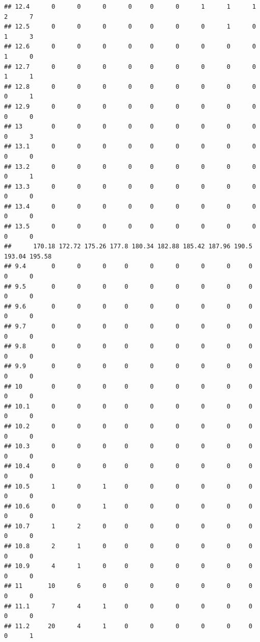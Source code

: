 \documentclass[
]{article}
\begin{document}
\begin{verbatim}
## 12.4      0      0      0      0     0      0      1      1      1     2      7
## 12.5      0      0      0      0     0      0      0      1      0     1      3
## 12.6      0      0      0      0     0      0      0      0      0     1      0
## 12.7      0      0      0      0     0      0      0      0      0     1      1
## 12.8      0      0      0      0     0      0      0      0      0     0      1
## 12.9      0      0      0      0     0      0      0      0      0     0      0
## 13        0      0      0      0     0      0      0      0      0     0      3
## 13.1      0      0      0      0     0      0      0      0      0     0      0
## 13.2      0      0      0      0     0      0      0      0      0     0      1
## 13.3      0      0      0      0     0      0      0      0      0     0      0
## 13.4      0      0      0      0     0      0      0      0      0     0      0
## 13.5      0      0      0      0     0      0      0      0      0     0      0
##      170.18 172.72 175.26 177.8 180.34 182.88 185.42 187.96 190.5 193.04 195.58
## 9.4       0      0      0     0      0      0      0      0     0      0      0
## 9.5       0      0      0     0      0      0      0      0     0      0      0
## 9.6       0      0      0     0      0      0      0      0     0      0      0
## 9.7       0      0      0     0      0      0      0      0     0      0      0
## 9.8       0      0      0     0      0      0      0      0     0      0      0
## 9.9       0      0      0     0      0      0      0      0     0      0      0
## 10        0      0      0     0      0      0      0      0     0      0      0
## 10.1      0      0      0     0      0      0      0      0     0      0      0
## 10.2      0      0      0     0      0      0      0      0     0      0      0
## 10.3      0      0      0     0      0      0      0      0     0      0      0
## 10.4      0      0      0     0      0      0      0      0     0      0      0
## 10.5      1      0      1     0      0      0      0      0     0      0      0
## 10.6      0      0      1     0      0      0      0      0     0      0      0
## 10.7      1      2      0     0      0      0      0      0     0      0      0
## 10.8      2      1      0     0      0      0      0      0     0      0      0
## 10.9      4      1      0     0      0      0      0      0     0      0      0
## 11       10      6      0     0      0      0      0      0     0      0      0
## 11.1      7      4      1     0      0      0      0      0     0      0      0
## 11.2     20      4      1     0      0      0      0      0     0      0      1

\end{verbatim}
\end{document}
